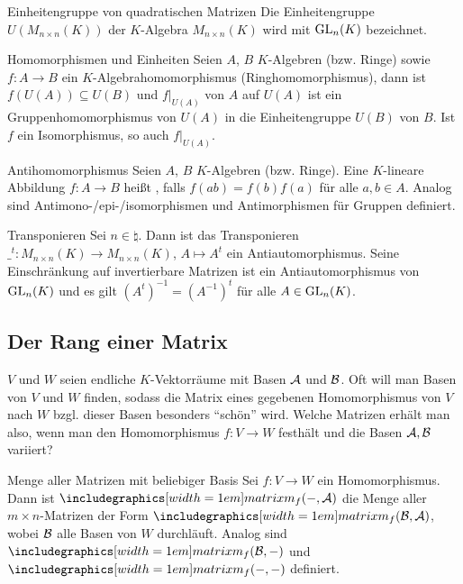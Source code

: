 \begin{Def}{Einheitengruppe von quadratischen Matrizen}
    Die Einheitengruppe $U(M_{n \times n}(K))$ der $K$-Algebra $M_{n \times n}(K)$
    wird mit $\operatorname{GL}_n(K)$ bezeichnet.
\end{Def}

\begin{Satz}{Homomorphismen und Einheiten}
    Seien $A$, $B$ $K$-Algebren (bzw. Ringe) sowie $f: A \rightarrow B$
    ein $K$-Algebrahomomorphismus (Ringhomomorphismus),
    dann ist $f(U(A)) \subseteq U(B)$ und $f|_{U(A)}$ von $A$ auf $U(A)$ ist
    ein Gruppenhomomorphismus von $U(A)$ in die Einheitengruppe $U(B)$ von $B$.
    Ist $f$ ein Isomorphismus, so auch $f|_{U(A)}$.
\end{Satz}

\begin{Def}{Antihomomorphismus}
    Seien $A$, $B$ $K$-Algebren (bzw. Ringe).
    Eine $K$-lineare Abbildung $f: A \rightarrow B$ heißt
    ,
    falls $f(ab) = f(b)f(a)$ für alle $a, b \in A$.
    Analog sind Antimono-/epi-/isomorphismen und Antimorphismen für Gruppen
    definiert.
\end{Def}

\begin{Satz}{Transponieren}
    Sei $n \in \natural$.
    Dann ist das Transponieren
    $\_^t: M_{n \times n}(K) \rightarrow M_{n \times n}(K)$, $A \mapsto A^t$
    ein Antiautomorphismus.
    Seine Einschränkung auf invertierbare Matrizen ist ein Antiautomorphismus
    von $\operatorname{GL}_n(K)$ und es gilt $(A^t)^{-1} = (A^{-1})^t$ für alle
    $A \in \operatorname{GL}_n(K)$.
\end{Satz}

\subsection{%
    Der Rang einer Matrix%
}

\begin{Bem}
    $V$ und $W$ seien endliche $K$-Vektorräume mit Basen $\mathcal{A}$ und
    $\mathcal{B}$.
    Oft will man Basen von $V$ und $W$ finden, sodass die Matrix eines
    gegebenen Homomorphismus von $V$ nach $W$ bzgl. dieser Basen besonders
    "`schön"' wird.
    Welche Matrizen erhält man also, wenn man den Homomorphismus
    $f: V \rightarrow W$ festhält und die Basen $\mathcal{A}, \mathcal{B}$
    variiert?
\end{Bem}

\begin{Def}{Menge aller Matrizen mit beliebiger Basis}
    Sei $f: V \rightarrow W$ ein Homomorphismus.
    Dann ist $\hommatrix{f}{-}{A}$ die Menge aller $m \times n$-Matrizen
    der Form $\hommatrix{f}{B}{A}$, wobei $\mathcal{B}$ alle Basen von $W$
    durchläuft.
    Analog sind $\hommatrix{f}{B}{-}$ und $\hommatrix{f}{-}{-}$ definiert.
\end{Def}

